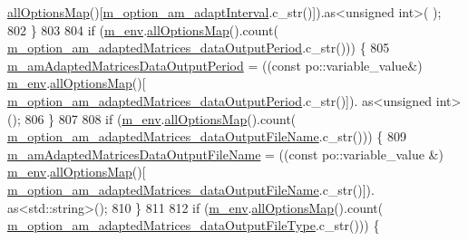 \begin{DoxyCode}
{{{{{{      \hyperlink{class_q_u_e_s_o_1_1_base_environment_ae7cee155956e0e70112f45e2ad1f02c8}{allOptionsMap}()[\hyperlink{class_q_u_e_s_o_1_1_m_l_sampling_level_options_aaa6a4e45bd064d7b4656e71cfd71d58b}{m\_option\_am\_adaptInterval}.c\_str()]).as<unsigned int>(
      );
802   \}
803 
804   \textcolor{keywordflow}{if} (\hyperlink{class_q_u_e_s_o_1_1_m_l_sampling_level_options_a5bdc1fb3f6eb46f73feec9c356c9a1b8}{m\_env}.\hyperlink{class_q_u_e_s_o_1_1_base_environment_ae7cee155956e0e70112f45e2ad1f02c8}{allOptionsMap}().count(
      \hyperlink{class_q_u_e_s_o_1_1_m_l_sampling_level_options_ac8ab2064bc916c10fa3c7bf1793869e8}{m\_option\_am\_adaptedMatrices\_dataOutputPeriod}.c\_str())) \{
805     \hyperlink{class_q_u_e_s_o_1_1_m_l_sampling_level_options_a8c7ce073c75774afdbffa1ba3674085c}{m\_amAdaptedMatricesDataOutputPeriod} = ((\textcolor{keyword}{const} po::variable\_value&) 
      \hyperlink{class_q_u_e_s_o_1_1_m_l_sampling_level_options_a5bdc1fb3f6eb46f73feec9c356c9a1b8}{m\_env}.\hyperlink{class_q_u_e_s_o_1_1_base_environment_ae7cee155956e0e70112f45e2ad1f02c8}{allOptionsMap}()[
      \hyperlink{class_q_u_e_s_o_1_1_m_l_sampling_level_options_ac8ab2064bc916c10fa3c7bf1793869e8}{m\_option\_am\_adaptedMatrices\_dataOutputPeriod}.c\_str()]).
      as<unsigned int>();
806   \}
807 
808   \textcolor{keywordflow}{if} (\hyperlink{class_q_u_e_s_o_1_1_m_l_sampling_level_options_a5bdc1fb3f6eb46f73feec9c356c9a1b8}{m\_env}.\hyperlink{class_q_u_e_s_o_1_1_base_environment_ae7cee155956e0e70112f45e2ad1f02c8}{allOptionsMap}().count(
      \hyperlink{class_q_u_e_s_o_1_1_m_l_sampling_level_options_a50b0b030e51402badf96072ea3add0ba}{m\_option\_am\_adaptedMatrices\_dataOutputFileName}.c\_str())) \{
809     \hyperlink{class_q_u_e_s_o_1_1_m_l_sampling_level_options_a7dde9af112143992a87a72635e63a864}{m\_amAdaptedMatricesDataOutputFileName} = ((\textcolor{keyword}{const} po::variable\_value
      &) \hyperlink{class_q_u_e_s_o_1_1_m_l_sampling_level_options_a5bdc1fb3f6eb46f73feec9c356c9a1b8}{m\_env}.\hyperlink{class_q_u_e_s_o_1_1_base_environment_ae7cee155956e0e70112f45e2ad1f02c8}{allOptionsMap}()[
      \hyperlink{class_q_u_e_s_o_1_1_m_l_sampling_level_options_a50b0b030e51402badf96072ea3add0ba}{m\_option\_am\_adaptedMatrices\_dataOutputFileName}.c\_str()]).
      as<std::string>();
810   \}
811 
812   \textcolor{keywordflow}{if} (\hyperlink{class_q_u_e_s_o_1_1_m_l_sampling_level_options_a5bdc1fb3f6eb46f73feec9c356c9a1b8}{m\_env}.\hyperlink{class_q_u_e_s_o_1_1_base_environment_ae7cee155956e0e70112f45e2ad1f02c8}{allOptionsMap}().count(
      \hyperlink{class_q_u_e_s_o_1_1_m_l_sampling_level_options_adaf47c65997276c4e7a2e5437a49f5eb}{m\_option\_am\_adaptedMatrices\_dataOutputFileType}.c\_str())) \{
}}}}}}
\end{DoxyCode}

